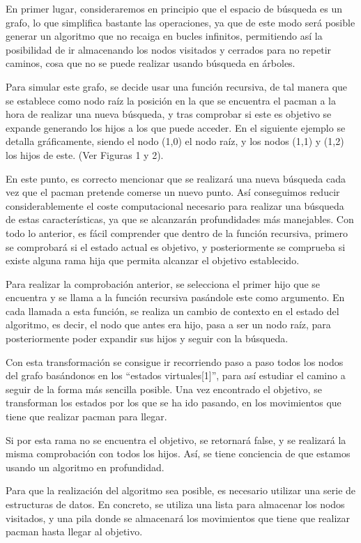\documentclass[letterpaper, 10 pt, conference]{ieeeconf}  %
\begin{document}
En primer lugar, consideraremos en principio que el espacio de búsqueda es un grafo, lo que simplifica bastante las operaciones, ya que de este modo será posible generar un algoritmo que no recaiga en bucles infinitos, permitiendo así la posibilidad de ir almacenando los nodos visitados y cerrados para no repetir caminos, cosa que no se puede realizar usando búsqueda en árboles.

Para simular este grafo, se decide usar una función recursiva, de tal manera que se establece como nodo raíz la posición en la que se encuentra el pacman a la hora de realizar una nueva búsqueda, y tras comprobar si este es objetivo se expande generando los hijos a los que puede acceder. En el siguiente ejemplo se detalla gráficamente, siendo el nodo (1,0) el nodo raíz, y los nodos (1,1) y (1,2) los hijos de este. (Ver Figuras 1 y 2).

En este punto, es correcto mencionar que se realizará una nueva búsqueda cada vez que el pacman pretende comerse un nuevo punto. Así conseguimos reducir considerablemente el coste computacional necesario para realizar una búsqueda de estas características, ya que se alcanzarán profundidades más manejables.
Con todo lo anterior, es fácil comprender que dentro de la función recursiva, primero se comprobará si el estado actual es objetivo, y posteriormente se comprueba si existe alguna rama hija que permita alcanzar el objetivo establecido.


Para realizar la comprobación anterior, se selecciona el primer hijo que se encuentra y se llama a la función recursiva pasándole este como argumento. En cada llamada a esta función, se realiza un cambio de contexto en el estado del algoritmo, es decir, el nodo que antes era hijo,  pasa a ser un nodo raíz, para posteriormente poder expandir sus hijos y seguir con la búsqueda.

Con esta transformación se consigue ir recorriendo paso a paso todos los nodos del grafo basándonos en los “estados virtuales[1]”, para así estudiar el camino a seguir de la forma más sencilla posible. Una vez encontrado el objetivo, se transforman los estados por los que se ha ido pasando, en los movimientos que tiene que realizar pacman para llegar.

Si por esta rama no se encuentra el objetivo, se retornará false, y se realizará la misma comprobación con todos los hijos. Así, se tiene conciencia de que estamos usando un algoritmo en profundidad. 

Para que la realización del algoritmo sea posible, es necesario utilizar una serie de estructuras de datos. En concreto, se utiliza una lista para almacenar los nodos visitados, y una pila donde se almacenará los movimientos que tiene que realizar pacman hasta llegar al objetivo.
\end{document}
